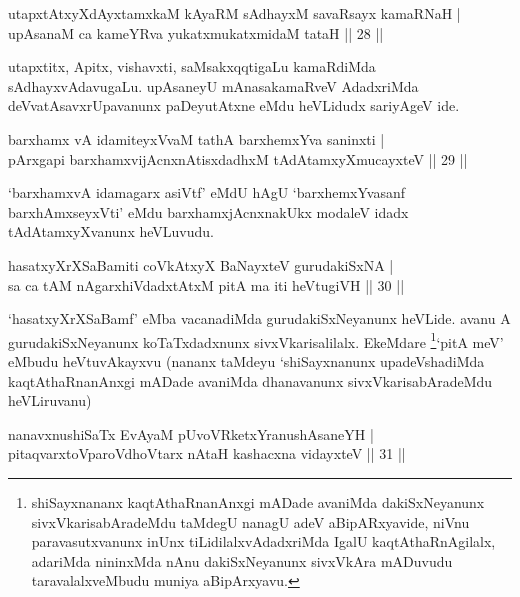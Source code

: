 \begin{shl}
utapxtAtxyXdAyxtamxkaM kAyaRM sAdhayxM savaRsayx kamaRNaH |\\
upAsanaM ca kameYRva yukatxmukatxmidaM tataH \hfill || 28 || 
\end{shl}

\begin{artha}
utapxtitx, Apitx, vishavxti, saMsakxqqtigaLu kamaRdiMda sAdhayxvAdavugaLu. upAsaneyU mAnasakamaRveV AdadxriMda deVvatAsavxrUpavanunx paDeyutAtxne eMdu heVLidudx sariyAgeV ide.
\end{artha}

\begin{shl}
barxhamx vA idamiteyxVvaM tathA barxhemxYva saninxti |\\
pArxgapi barxhamxvijAcnxnAtisxdadhxM tAdAtamxyXmucayxteV \hfill || 29 || 
\end{shl}

\begin{artha}
`barxhamxvA idamagarx asiVtf' eMdU hAgU `barxhemxYvasanf barxhAmxseyxVti' eMdu barxhamxjAcnxnakUkx modaleV idadx tAdAtamxyXvanunx heVLuvudu.
\end{artha}


\begin{shl}
hasatxyXrXSaBamiti coVkAtxyX BaNayxteV gurudakiSxNA |\\
sa ca tAM nAgarxhiVdadxtAtxM pitA ma iti heVtugiVH \hfill || 30 || 
\end{shl}

\begin{artha}
`hasatxyXrXSaBamf' eMba vacanadiMda gurudakiSxNeyanunx heVLide. avanu A gurudakiSxNeyanunx koTaTxdadxnunx sivxVkarisalilalx. EkeMdare \footnote{shiSayxnananx kaqtAthaRnanAnxgi mADade avaniMda dakiSxNeyanunx sivxVkarisabAradeMdu taMdegU nanagU adeV aBipARxyavide, niVnu paravasutxvanunx inUnx tiLidilalxvAdadxriMda IgalU kaqtAthaRnAgilalx, adariMda nininxMda nAnu dakiSxNeyanunx sivxVkAra mADuvudu taravalalxveMbudu muniya aBipArxyavu.}`pitA meV' eMbudu heVtuvAkayxvu (nananx taMdeyu `shiSayxnanunx upadeVshadiMda kaqtAthaRnanAnxgi mADade avaniMda dhanavanunx sivxVkarisabAradeMdu heVLiruvanu)
\end{artha}


\begin{shl}
nanavxnushiSaTx EvAyaM pUvoVRketxYranushAsaneYH |\\
pitaqvarxtoVparoVdhoV\s tarx nAtaH kashacxna vidayxteV \hfill || 31 || 
\end{shl}

